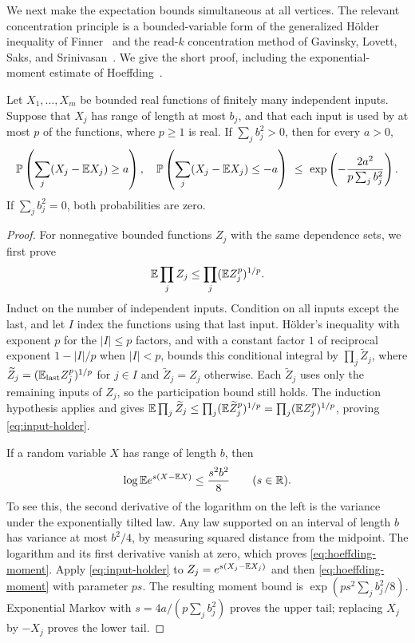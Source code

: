 We next make the expectation bounds simultaneous at all vertices.
The relevant concentration principle is a bounded-variable form of
the generalized H\"older inequality of Finner~\cite{Finner} and the
read-$k$ concentration method of Gavinsky, Lovett, Saks, and
Srinivasan~\cite{GavinskyReadK}.  We give the short proof, including
the exponential-moment estimate of Hoeffding~\cite{Hoeffding1963}.

\begin{lemma}\label{lem:read-concentration}
Let $X_1,\ldots,X_m$ be bounded real functions of finitely many
independent inputs.  Suppose that $X_j$ has range of length at most
$b_j$, and that each input is used by at most $p$ of the functions,
where $p\ge1$ is real.  If $\sum_jb_j^2>0$, then for every $a>0$,
\begin{equation}\label{eq:input-concentration}
 \mathbb P\left(\sum_j(X_j-\mathbb E X_j)\ge a\right),\quad
 \mathbb P\left(\sum_j(X_j-\mathbb E X_j)\le-a\right)
 \ \le\ \exp\left(-\frac{2a^2}{p\sum_jb_j^2}\right).
\end{equation}
If $\sum_jb_j^2=0$, both probabilities are zero.
\end{lemma}

\begin{proof}
For nonnegative bounded functions $Z_j$ with the same dependence
sets, we first prove
\begin{equation}\label{eq:input-holder}
 \mathbb E\prod_j Z_j\le\prod_j(\mathbb E Z_j^p)^{1/p}.
\end{equation}
Induct on the number of independent inputs.  Condition on all inputs
except the last, and let $I$ index the functions using that last input.
H\"older's inequality with exponent $p$ for the $|I|\le p$ factors,
and with a constant factor $1$ of reciprocal exponent $1-|I|/p$ when
$|I|<p$, bounds this conditional integral
by $\prod_j\widetilde Z_j$, where
$\widetilde Z_j=(\mathbb E_{\mathrm{last}}Z_j^p)^{1/p}$ for $j\in I$ and
$\widetilde Z_j=Z_j$ otherwise.  Each $\widetilde Z_j$ uses only the
remaining inputs of $Z_j$, so the participation bound still holds.
The induction hypothesis applies and gives
$\mathbb E\prod_j\widetilde Z_j\le
\prod_j(\mathbb E\widetilde Z_j^p)^{1/p}
=\prod_j(\mathbb E Z_j^p)^{1/p}$, proving \eqref{eq:input-holder}.

If a random variable $X$ has range of length $b$, then
\begin{equation}\label{eq:hoeffding-moment}
 \log\mathbb E e^{s(X-\mathbb E X)}\le\frac{s^2b^2}{8}\qquad(s\in\mathbb R).
\end{equation}
To see this, the second derivative of the logarithm on the left is
the variance under the exponentially tilted law.  Any law supported
on an interval of length $b$ has variance at most $b^2/4$, by measuring
squared distance from the midpoint.  The logarithm and its first
derivative vanish at zero, which proves \eqref{eq:hoeffding-moment}.
Apply \eqref{eq:input-holder} to
$Z_j=e^{s(X_j-\mathbb E X_j)}$ and then \eqref{eq:hoeffding-moment} with
parameter $ps$.  The resulting moment bound is
$\exp(ps^2\sum_jb_j^2/8)$.  Exponential Markov with
$s=4a/(p\sum_jb_j^2)$ proves the upper tail; replacing $X_j$ by
$-X_j$ proves the lower tail.
\end{proof}

